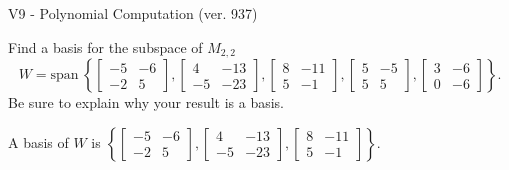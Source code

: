 \begin{exercise}
  \begin{exerciseTitle}V9 - Polynomial Computation (ver. 937)\end{exerciseTitle}
  \begin{exerciseStatement}
    Find a basis for the subspace of \(M_{2,2}\) 
\[W=\mathrm{span}\ \left\{\left[\begin{array}{cc}
-5 & -6 \\
-2 & 5
\end{array}\right] , \left[\begin{array}{cc}
4 & -13 \\
-5 & -23
\end{array}\right] , \left[\begin{array}{cc}
8 & -11 \\
5 & -1
\end{array}\right] , \left[\begin{array}{cc}
5 & -5 \\
5 & 5
\end{array}\right] , \left[\begin{array}{cc}
3 & -6 \\
0 & -6
\end{array}\right]\right\}.\]
 Be sure to explain why your result is a basis.


  \end{exerciseStatement}
  \begin{exerciseAnswer}
   A basis of \(W\) is  \(\left\{\left[\begin{array}{cc}
-5 & -6 \\
-2 & 5
\end{array}\right] , \left[\begin{array}{cc}
4 & -13 \\
-5 & -23
\end{array}\right] , \left[\begin{array}{cc}
8 & -11 \\
5 & -1
\end{array}\right]\right\}\).
  


  \end{exerciseAnswer}
\end{exercise}